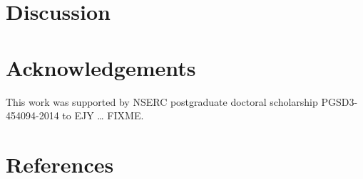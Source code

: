 \documentclass[10pt, letterpaper]{article}
\begin{document}
\section{Discussion}\label{discussion}

\section{Acknowledgements}\label{acknowledgements}

This work was supported by NSERC postgraduate doctoral scholarship
PGSD3-454094-2014 to EJY \ldots{} FIXME.

\section{References}\label{references}

\setlength{\parindent}{-0.1in} \setlength{\leftskip}{0.125in} \noindent
\end{document}
